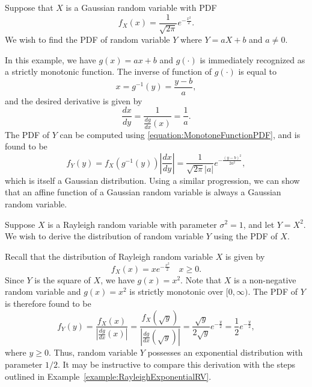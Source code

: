 \begin{example}
Suppose that $X$ is a Gaussian random variable with PDF
\begin{equation*}
f_X(x) = \frac{1}{\sqrt{2 \pi}} e^{- \frac{x^2}{2}} .
\end{equation*}
We wish to find the PDF of random variable $Y$ where $Y = a X + b$ and $a \neq 0$.

In this example, we have $g(x) = ax + b$ and $g(\cdot)$ is immediately recognized as a strictly monotonic function.
The inverse of function of $g(\cdot)$ is equal to
\begin{equation*}
x = g^{-1} (y) = \frac{y - b}{a} ,
\end{equation*}
and the desired derivative is given by
\begin{equation*}
\frac{dx}{dy} = \frac{1}{\frac{dg}{dx} (x)} = \frac{1}{a} .
\end{equation*}
The PDF of $Y$ can be computed using \eqref{equation:MonotoneFunctionPDF}, and is found to be
\begin{equation*}
f_Y(y) = f_X \left( g^{-1} (y) \right) \left| \frac{dx}{dy} \right|
= \frac{1}{\sqrt{2 \pi} |a|} e^{- \frac{(y-b)^2}{2 a^2} } ,
\end{equation*}
which is itself a Gaussian distribution.
Using a similar progression, we can show that an affine function of a Gaussian random variable is always a Gaussian random variable.
\end{example}

\begin{example}
Suppose $X$ is a Rayleigh random variable with parameter $\sigma^2 = 1$, and let $Y = X^2$.
We wish to derive the distribution of random variable $Y$ using the PDF of $X$.

Recall that the distribution of Rayleigh random variable $X$ is given by
\begin{equation*}
f_X (x) = x e^{- \frac{x^2}{2} } \quad x \geq 0.
\end{equation*}
Since $Y$ is the square of $X$, we have $g(x) = x^2$.
Note that $X$ is a non-negative random variable and $g(x) = x^2$ is strictly monotonic over $[0, \infty)$.
The PDF of $Y$ is therefore found to be
\begin{equation*}
f_Y(y) = \frac{f_X (x)}{\left| \frac{dg}{dx}(x)\right|}
= \frac{f_X \left( \sqrt{y} \right)}{\left| \frac{dg}{dx} \left( \sqrt{y} \right) \right|}
= \frac{\sqrt{y}}{2 \sqrt{y}} e^{- \frac{y}{2} }
= \frac{1}{2} e^{- \frac{y}{2} } ,
\end{equation*}
where $y \geq 0$.
Thus, random variable $Y$ possesses an exponential distribution with parameter $1 / 2$.
It may be instructive to compare this derivation with the steps outlined in Example~\ref{example:RayleighExponentialRV}.
\end{example}

